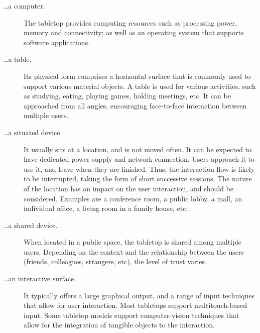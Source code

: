\begin{description}

\item[\ldots a computer.]
The tabletop provides computing resources such as processing power, memory and connectivity; as well as an operating system that supports software applications.

\item[\ldots a table.] 
Its physical form comprises a horizontal surface that is commonly used to support various material objects.
A table is used for various activities, such as studying, eating, playing games, holding meetings, etc.
It can be approached from all angles, encouraging face-to-face interaction between multiple users.

\item[\ldots a situated device.] 
It usually sits at a location, and is not moved often.
It can be expected to have dedicated power supply and network connection.
Users approach it to use it, and leave when they are finished.
Thus, the interaction flow is likely to be interrupted, taking the form of short successive sessions.
The nature of the location has an impact on the user interaction, and should be considered.
Examples are a conference room, a public lobby, a mall, an individual office, a living room in a family house, etc.

\item[\ldots a shared device.] 
When located in a public space, the tabletop is shared among multiple users.
Depending on the context and the relationship between the users (friends, colleagues, strangers, etc), the level of trust varies.

\item[\ldots an interactive surface.] 
It typically offers a large graphical output, and a range of input techniques that allow for user interaction.
Most tabletops support multitouch-based input.
Some tabletop models support computer-vision techniques that allow for the integration of tangible objects to the interaction.

\end{description}

